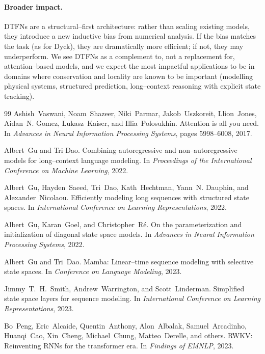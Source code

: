 \documentclass[10pt]{article}
\theoremstyle{definition}
\theoremstyle{remark}
\begin{document}
\paragraph{Broader impact.}
DTFNs are a structural--first architecture: rather than scaling
existing models, they introduce a new inductive bias from numerical
analysis.  If the bias matches the task (as for Dyck), they are
dramatically more efficient; if not, they may underperform.  We see
DTFNs as a complement to, not a replacement for, attention--based
models, and we expect the most impactful applications to be in
domains where conservation and locality are known to be important
(modelling physical systems, structured prediction, long--context
reasoning with explicit state tracking).


\begin{thebibliography}{99}
Ashish~Vaswani, Noam~Shazeer, Niki~Parmar, Jakob~Uszkoreit, Llion~Jones,
  Aidan~N. Gomez, Lukasz~Kaiser, and Illia~Polosukhin.
\newblock Attention is all you need.
\newblock In \emph{Advances in Neural Information Processing Systems}, pages
  5998--6008, 2017.

Albert~Gu and Tri Dao.
\newblock Combining autoregressive and non--autoregressive models for
  long--context language modeling.
\newblock In \emph{Proceedings of the International Conference on Machine
  Learning}, 2022.

Albert~Gu, Hayden~Saeed, Tri~Dao, Kath~Hechtman, Yann~N. Dauphin, and
  Alexander~Nicolaou.
\newblock Efficiently modeling long sequences with structured state spaces.
\newblock In \emph{International Conference on Learning Representations}, 2022.

Albert~Gu, Karan~Goel, and Christopher~R\'e.
\newblock On the parameterization and initialization of diagonal state space
  models.
\newblock In \emph{Advances in Neural Information Processing Systems}, 2022.

Albert~Gu and Tri~Dao.
\newblock Mamba: Linear--time sequence modeling with selective state spaces.
\newblock In \emph{Conference on Language Modeling}, 2023.

Jimmy~T.~H.~Smith, Andrew~Warrington, and Scott~Linderman.
\newblock Simplified state space layers for sequence modeling.
\newblock In \emph{International Conference on Learning Representations}, 2023.

Bo~Peng, Eric~Alcaide, Quentin~Anthony, Alon~Albalak, Samuel~Arcadinho,
  Huanqi~Cao, Xin~Cheng, Michael~Chung, Matteo~Derelle, and others.
\newblock RWKV: Reinventing RNNs for the transformer era.
\newblock In \emph{Findings of EMNLP}, 2023.


\end{thebibliography}
\end{document}
